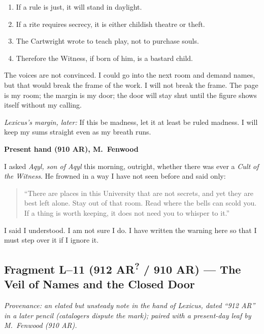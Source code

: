 \documentclass[11pt]{article}
\begin{document}
\begin{enumerate}\setlength\itemsep{0.25em}
  \item If a rule is just, it will stand in daylight.
  \item If a rite requires secrecy, it is either childish theatre or theft.
  \item The Cartwright wrote to teach play, not to purchase souls.
  \item Therefore the Witness, if born of him, is a bastard child.
\end{enumerate}

The voices are not convinced. I could go into the next room and demand names, but that would break the frame of the work. I will not break the frame. The page is my room; the margin is my door; the door will stay shut until the figure shows itself without my calling.

\medskip
\noindent\textit{Lexicus’s margin, later:} If this be madness, let it at least be ruled madness. I will keep my sums straight even as my breath runs.

\medskip
\noindent\textbf{Present hand (910 AR), M.\ Fenwood}

I asked \textit{Aqyl, son of Aqyl} this morning, outright, whether there was ever a \emph{Cult of the Witness}. He frowned in a way I have not seen before and said only:

\begin{quote}\small
``There are places in this University that are not secrets, and yet they are best left alone. Stay out of that room. Read where the bells can scold you. If a thing is worth keeping, it does not need you to whisper to it.''
\end{quote}

I said I understood. I am not sure I do. I have written the warning here so that I must step over it if I ignore it.

\subsection*{Fragment L--11 (912 AR\textsuperscript{?} / 910 AR) --- The Veil of Names and the Closed Door}
\label{frag:l11}
{}

\noindent\textit{Provenance: an elated but unsteady note in the hand of Lexicus, dated ``912 AR'' in a later pencil (catalogers dispute the mark); paired with a present-day leaf by M.\ Fenwood (910 AR).}
\end{document}
